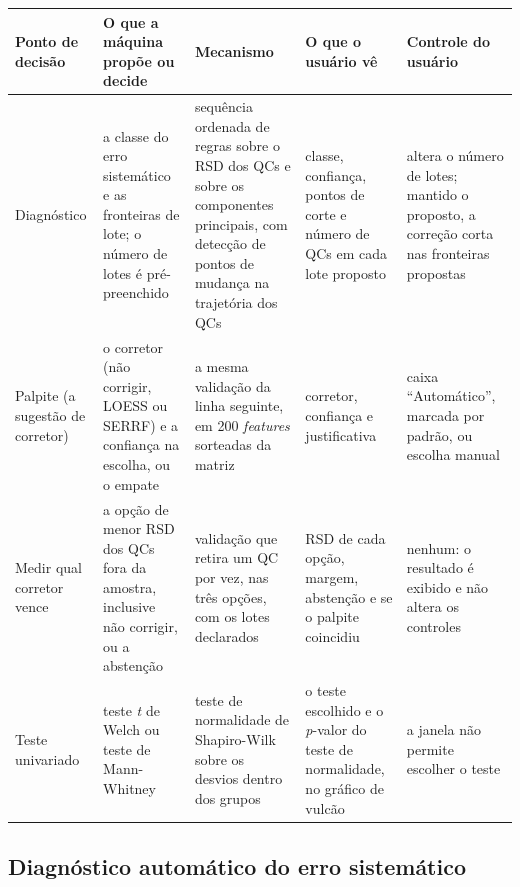 \par\medskip
\noindent\begin{minipage}{\linewidth}
  \label{quadro:ia-decisoes}
  \centering
  \footnotesize
  \setlength{\tabcolsep}{3pt}
  \begin{tabular}{|>{\raggedright\arraybackslash}p{1.9cm}|>{\raggedright\arraybackslash}p{3.0cm}|>{\raggedright\arraybackslash}p{3.1cm}|>{\raggedright\arraybackslash}p{3.0cm}|>{\raggedright\arraybackslash}p{2.7cm}|}
    \hline
    \textbf{Ponto de decisão} & \textbf{O que a máquina propõe ou decide} & \textbf{Mecanismo} & \textbf{O que o usuário vê} & \textbf{Controle do usuário} \\
    \hline
    Diagnóstico & a classe do erro sistemático e as fronteiras de lote; o número de lotes é pré-preenchido & sequência ordenada de regras sobre o RSD dos QCs e sobre os componentes principais, com detecção de pontos de mudança na trajetória dos QCs & classe, confiança, pontos de corte e número de QCs em cada lote proposto & altera o número de lotes; mantido o proposto, a correção corta nas fronteiras propostas \\
    \hline
    Palpite (a sugestão de corretor) & o corretor (não corrigir, LOESS ou SERRF) e a confiança na escolha, ou o empate & a mesma validação da linha seguinte, em 200 \emph{features} sorteadas da matriz & corretor, confiança e justificativa & caixa ``Automático'', marcada por padrão, ou escolha manual \\
    \hline
    Medir qual corretor vence & a opção de menor RSD dos QCs fora da amostra, inclusive não corrigir, ou a abstenção & validação que retira um QC por vez, nas três opções, com os lotes declarados & RSD de cada opção, margem, abstenção e se o palpite coincidiu & nenhum: o resultado é exibido e não altera os controles \\
    \hline
    Teste univariado & teste \emph{t} de Welch ou teste de Mann-Whitney & teste de normalidade de Shapiro-Wilk sobre os desvios dentro dos grupos & o teste escolhido e o \emph{p}-valor do teste de normalidade, no gráfico de vulcão & a janela não permite escolher o teste \\
    \hline
  \end{tabular}
\end{minipage}
\par\medskip

\subsection{Diagnóstico automático do erro sistemático}

